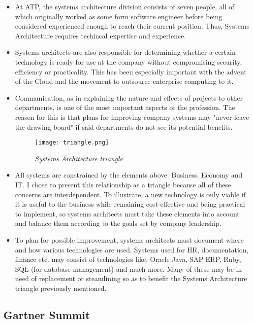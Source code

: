 \begin{itemize}
    \item At ATP, the systems architecture division consists of seven people, all of which originally worked as some form software engineer before being considered experienced enough to reach their current position. Thus, Systems Architecture requires techincal expertise and experience.
    \item Systems architects are also responsible for determining whether a certain technology is ready for use at the company without compromising security, efficiency or practicality. This has been especially important with the advent of the Cloud and the movement to outsource enterprise computing to it.
    \item Communication, as in explaining the nature and effects of projects to other departments, is one of the most important aspects of the profession. The reason for this is that plans for improving company systems may "never leave the drawing board" if said departments do not see its potential benefits.

    \begin{figure}[H]
        \centering
            \texttt{[image: triangle.png]}
            \caption*{\textit{Systems Architecture triangle}}
    \end{figure}

    \item All systems are constrained by the elements above: Business, Economy and IT. I chose to present this relationship as a triangle because all of these concerns are interdependent. To illustrate, a new technology is only viable if it is useful to the business while remaining cost-effective and being practical to implement, so systems architects must take these elements into account and balance them according to the goals set by company leadership. 
    \item To plan for possible improvement, systems architects must document where and how various technologies are used. Systems used for HR, documentation, finance etc. may consist of technologies like, Oracle Java, SAP ERP, Ruby, SQL (for database management) and much more. Many of these may be in need of replacement or steamlining so as to benefit the Systems Architecture triangle previously mentioned.
\end{itemize}


\subsection{Gartner Summit}

